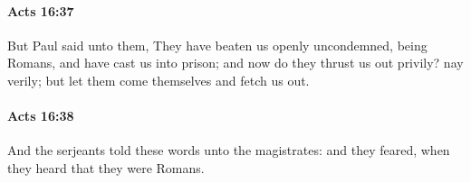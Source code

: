 		\paragraph{Acts 16:37} %
			\label{ACTS-16-37}

			But Paul said unto them, They have beaten us openly uncondemned, being Romans, and have cast us into prison; and now do they thrust us out privily?  nay verily; but let them come themselves and fetch us out.

			\begin{framed}
			\scriptsize
				\begin{compactdesc}
					\item[SBLG] 
				\end{compactdesc}
			\end{framed}

		\paragraph{Acts 16:38} %
			\label{ACTS-16-38}

			And the serjeants told these words unto the magistrates: and they feared, when they heard that they were Romans.

